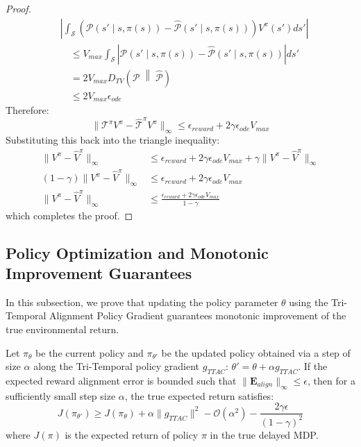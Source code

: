 \documentclass[manuscript, screen, review]{jair}
\begin{document}
\begin{proof}
\begin{align*}
    &\left| \int_{\mathcal{S}} \left( \mathcal{P}(s' \mid s, \pi(s)) - \hat{\mathcal{P}}(s' \mid s, \pi(s)) \right) V^\pi(s') ds' \right| \\
    &\quad \le V_{max} \int_{\mathcal{S}} \left| \mathcal{P}(s' \mid s, \pi(s)) - \hat{\mathcal{P}}(s' \mid s, \pi(s)) \right| ds' \\
    &\quad = 2 V_{max} D_{TV}\left( \mathcal{P} \;\middle\|\; \hat{\mathcal{P}} \right) \\
    &\quad \le 2 V_{max} \epsilon_{ode}
\end{align*}
Therefore:
\begin{equation*}
    \| \mathcal{T}^\pi V^\pi - \hat{\mathcal{T}}^\pi V^\pi \|_\infty \le \epsilon_{reward} + 2 \gamma \epsilon_{ode} V_{max}
\end{equation*}
Substituting this back into the triangle inequality:
\begin{align*}
    \| V^\pi - \hat{V}^\pi \|_\infty &\le \epsilon_{reward} + 2 \gamma \epsilon_{ode} V_{max} + \gamma \| V^\pi - \hat{V}^\pi \|_\infty \\
    (1 - \gamma) \| V^\pi - \hat{V}^\pi \|_\infty &\le \epsilon_{reward} + 2 \gamma \epsilon_{ode} V_{max} \\
    \| V^\pi - \hat{V}^\pi \|_\infty &\le \frac{\epsilon_{reward} + 2 \gamma \epsilon_{ode} V_{max}}{1 - \gamma}
\end{align*}
which completes the proof.
\end{proof}

\subsection{Policy Optimization and Monotonic Improvement Guarantees}
In this subsection, we prove that updating the policy parameter $\theta$ using the Tri-Temporal Alignment Policy Gradient guarantees monotonic improvement of the true environmental return.

\begin{theorem}\label{thm:policy_improvement}
Let $\pi_\theta$ be the current policy and $\pi_{\theta'}$ be the updated policy obtained via a step of size $\alpha$ along the Tri-Temporal policy gradient $g_{TTAC}$: $\theta' = \theta + \alpha g_{TTAC}$. If the expected reward alignment error is bounded such that $\|\mathbf{E}_{align}\|_\infty \le \epsilon$, then for a sufficiently small step size $\alpha$, the true expected return satisfies:
\begin{equation}
    J(\pi_{\theta'}) \ge J(\pi_\theta) + \alpha \| g_{TTAC} \|^2 - \mathcal{O}(\alpha^2) - \frac{2 \gamma \epsilon}{(1-\gamma)^2}
\end{equation}
where $J(\pi)$ is the expected return of policy $\pi$ in the true delayed MDP.
\end{theorem}
\end{document}
